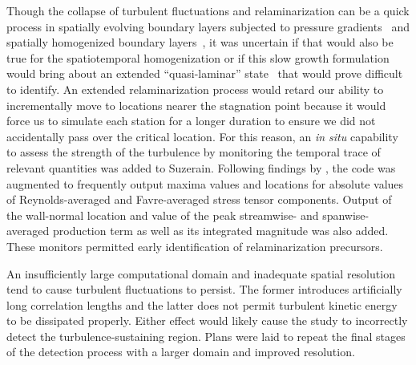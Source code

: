 Though the collapse of turbulent fluctuations and relaminarization can be a
quick process in spatially evolving boundary layers subjected to pressure
gradients~\citep{Mukund2006Relaminarization} and spatially homogenized boundary
layers~\citep[\textsection{}3.2]{Spalart1988Direct}, it was uncertain if that
would also be true for the \citet{Topalian2014Spatiotemporal} spatiotemporal
homogenization or if this slow growth formulation would bring about an
extended ``quasi-laminar'' state~\citep{Narasimha1979Relaminarization,
Sreenivasan1982Laminarescent} that would prove difficult to identify.  An
extended relaminarization process would retard our ability to incrementally move
to locations nearer the stagnation point because it would force us to simulate
each station for a longer duration to ensure we did not accidentally pass over
the critical location.
%
For this reason, an \emph{in situ} capability to assess the strength of the
turbulence by monitoring the temporal trace of relevant quantities was added to
Suzerain.  Following findings by \citet{Cal2008Similarity}, the code was
augmented to frequently output maxima values and locations for absolute values
of Reynolds-averaged and Favre-averaged stress tensor components.  Output of the
wall-normal location and value of the peak streamwise- and spanwise-averaged
production term as well as its integrated magnitude was also added.  These
monitors permitted early identification of relaminarization precursors.

An insufficiently large computational domain and inadequate spatial resolution
tend to cause turbulent fluctuations to persist.  The former introduces
artificially long correlation lengths and the latter does not permit turbulent
kinetic energy to be dissipated properly.  Either effect would likely cause the
study to incorrectly detect the turbulence-sustaining region.  Plans were laid
to repeat the final stages of the detection process with a larger domain and
improved resolution.

